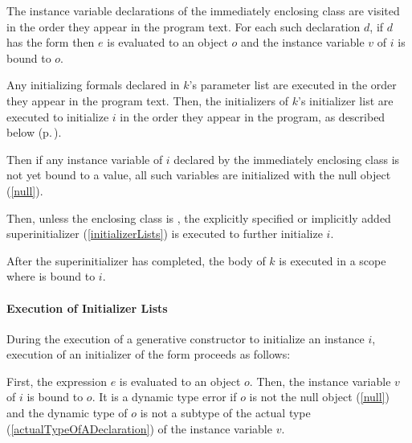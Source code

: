 \documentclass[makeidx]{article}
\begin{document}
\LMHash{}%
The instance variable declarations of the immediately enclosing class are visited in the order they appear in the program text.
For each such declaration $d$, if $d$ has the form
then $e$ is evaluated to an object $o$
and the instance variable $v$ of $i$ is bound to $o$.

\LMHash{}%
Any initializing formals declared in $k$'s parameter list are executed in the order they appear in the program text.
Then, the initializers of $k$'s initializer list are executed to initialize $i$
in the order they appear in the program, as described below
(p.\,\pageref{executionOfInitializerLists}).


\LMHash{}%
Then if any instance variable of $i$ declared by the immediately enclosing class
is not yet bound to a value,
all such variables are initialized with the null object (\ref{null}).

\LMHash{}%
Then, unless the enclosing class is , the explicitly specified or
implicitly added superinitializer (\ref{initializerLists}) is executed to
further initialize $i$.

\LMHash{}%
After the superinitializer has completed, the body of $k$ is executed in a scope where \THIS{} is bound to $i$.



\paragraph{Execution of Initializer Lists}

\LMHash{}%
During the execution of a generative constructor to initialize an instance $i$,
execution of an initializer of the form 
proceeds as follows:

\LMHash{}%
First, the expression $e$ is evaluated to an object $o$.
Then, the instance variable $v$ of $i$ is bound to $o$.
It is a dynamic type error if $o$ is not the null object
(\ref{null})
and the dynamic type of $o$ is not a subtype of the actual type
(\ref{actualTypeOfADeclaration})
of the instance variable $v$.
\end{document}
